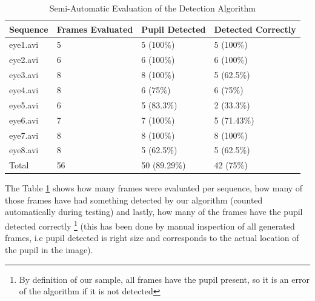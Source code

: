\begin{table}[h!]
	\center
	\begin{tabular}{ |l|l|l|l| }
		\hline
		Sequence & Frames Evaluated & Pupil Detected & Detected Correctly \\ \hline
		
		eye1.avi 	& 5 	& 5 (100\%)	& 5 (100\%) \\
		eye2.avi 	& 6 	& 6 (100\%)	& 6 (100\%) \\
		eye3.avi 	& 8 	& 8 (100\%)	& 5 (62.5\%) \\
		eye4.avi 	& 8 	& 6 (75\%)	& 6 (75\%) \\
		eye5.avi 	& 6 	& 5 (83.3\%)	& 2 (33.3\%) \\
		eye6.avi 	& 7 	& 7 (100\%)	& 5 (71.43\%) \\
		eye7.avi 	& 8 	& 8 (100\%)	& 8 (100\%) \\
		eye8.avi 	& 8 	& 5 (62.5\%)	& 5 (62.5\%) \\
		
		\hline
		Total 	& 56 & 50 (89.29\%) & 42 (75\%) \\ 
		\hline
	\end{tabular}
	\caption{Semi-Automatic Evaluation of the Detection Algorithm}
	\label{tab:eval}
\end{table}

The Table \ref{tab:eval} shows how many frames were evaluated per sequence, how many of those frames have had something detected by our algorithm (counted automatically during testing) and lastly, how many of the frames have the pupil detected correctly \footnote{By definition of our sample, all frames have the pupil present, so it is an error of the algorithm if it is not detected} (this has been done by manual inspection of all generated frames, i.e pupil detected is right size and corresponds to the actual location of the pupil in the image). 


